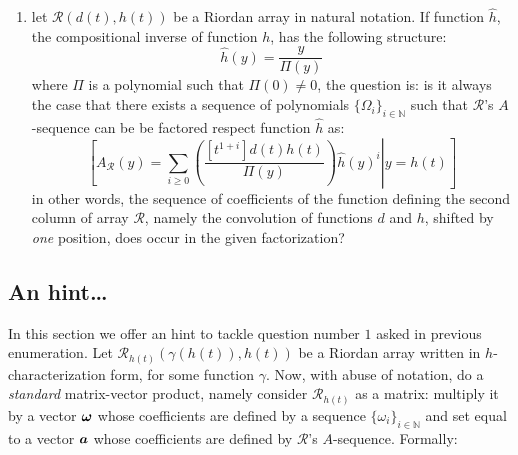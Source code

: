 \begin{enumerate}
    \item let $\mathcal{R}(d(t),h(t))$ be a Riordan array in 
        natural notation. If function $\hat{h}$, the compositional inverse
        of function $h$, has the following structure:
        \begin{displaymath}
            \hat{h}(y) = \frac{y}{\Pi(y)}
        \end{displaymath}
        where $\Pi$ is a polynomial such that $\Pi(0)\not=0$, the question is:
        is it always the case that there exists a sequence of polynomials
        $\lbrace \Omega_{i} \rbrace_{i\in\mathbb{N}}$ such
        that $\mathcal{R}$'s $A$-sequence can be be factored respect
        function $\hat{h}$ as:
        \begin{displaymath}
                \left.\left[
                    A_{\mathcal{R}}(y) = \sum_{i \geq0}{
                        \left(\frac{[t^{1+i}]d(t)h(t)}
                            {\Pi(y)}\right)
                        \hat{h}(y)^{i}} 
                        \right| y = h(t) \right]
        \end{displaymath}
        in other words, the sequence of coefficients of the function defining
        the second column of array $\mathcal{R}$, namely the convolution of functions 
        $d$ and $h$, shifted by \emph{one} position, does occur in
        the given factorization?

\end{enumerate}

\subsection{An hint\ldots}

In this section we offer an hint to tackle question number $1$
asked in previous enumeration. Let $\mathcal{R}_{h(t)}(\gamma(h(t)), h(t))$
be a Riordan array written in $h$-characterization form, for some function $\gamma$. 
Now, with abuse of notation, do a \emph{standard} matrix-vector product, namely
consider $\mathcal{R}_{h(t)}$ as a matrix: multiply it by a vector $\boldsymbol{\omega}$
whose coefficients are defined by a sequence $\lbrace \omega_i \rbrace_{i\in\mathbb{N}}$
and set equal to a vector $\boldsymbol{a}$ whose coefficients are defined by $\mathcal{R}$'s
$A$-sequence. Formally:

